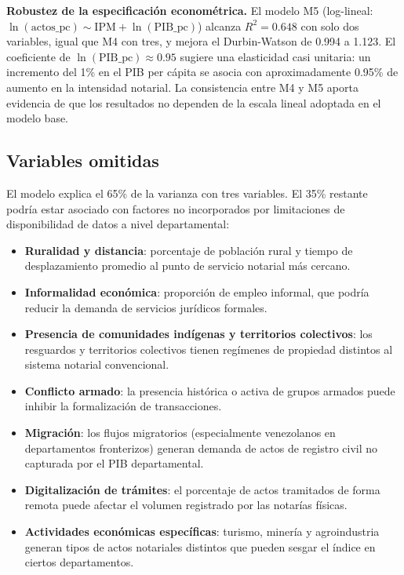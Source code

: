 \documentclass{article}
\begin{document}
\medskip
\noindent\textbf{Robustez de la especificación econométrica.}
El modelo M5 (log-lineal: $\ln(\text{actos\_pc}) \sim \text{IPM} +
\ln(\text{PIB\_pc})$) alcanza $R^2=0.648$ con solo dos variables, igual
que M4 con tres, y mejora el Durbin-Watson de 0.994 a 1.123. El
coeficiente de $\ln(\text{PIB\_pc}) \approx 0.95$ sugiere una
elasticidad casi unitaria: un incremento del 1\% en el PIB per cápita
se asocia con aproximadamente 0.95\% de aumento en la intensidad
notarial. La consistencia entre M4 y M5 aporta evidencia de que los
resultados no dependen de la escala lineal adoptada en el modelo base.

\subsection{Variables omitidas}
\label{subsec:omitidas}

El modelo explica el 65\% de la varianza con tres variables. El 35\%
restante podría estar asociado con factores no incorporados por
limitaciones de disponibilidad de datos a nivel departamental:

\begin{itemize}
    \item \textbf{Ruralidad y distancia}: porcentaje de población
    rural y tiempo de desplazamiento promedio al punto de servicio
    notarial más cercano.
    \item \textbf{Informalidad económica}: proporción de empleo
    informal, que podría reducir la demanda de servicios jurídicos
    formales.
    \item \textbf{Presencia de comunidades indígenas y territorios
    colectivos}: los resguardos y territorios colectivos tienen
    regímenes de propiedad distintos al sistema notarial convencional.
    \item \textbf{Conflicto armado}: la presencia histórica o activa
    de grupos armados puede inhibir la formalización de transacciones.
    \item \textbf{Migración}: los flujos migratorios (especialmente
    venezolanos en departamentos fronterizos) generan demanda de actos
    de registro civil no capturada por el PIB departamental.
    \item \textbf{Digitalización de trámites}: el porcentaje de actos
    tramitados de forma remota puede afectar el volumen registrado por
    las notarías físicas.
    \item \textbf{Actividades económicas específicas}: turismo, minería
    y agroindustria generan tipos de actos notariales distintos que
    pueden sesgar el índice en ciertos departamentos.
\end{itemize}
\end{document}
